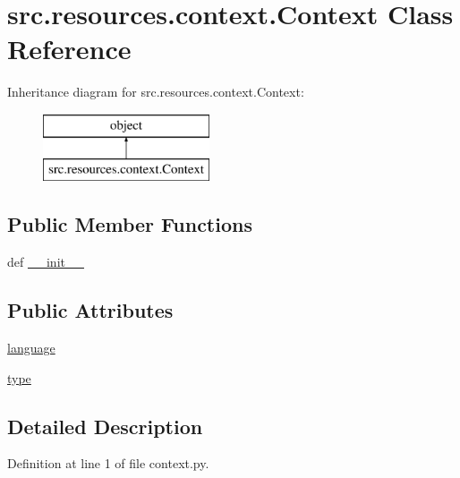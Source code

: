 \hypertarget{classsrc_1_1resources_1_1context_1_1_context}{\section{src.\+resources.\+context.\+Context Class Reference}
\label{classsrc_1_1resources_1_1context_1_1_context}
}
Inheritance diagram for src.\+resources.\+context.\+Context\+:\begin{figure}[H]
\begin{center}
\leavevmode
\includegraphics[height=2.000000cm]{classsrc_1_1resources_1_1context_1_1_context}
\end{center}
\end{figure}
\subsection*{Public Member Functions}
\begin{DoxyCompactItemize}
\item 
def \hyperlink{classsrc_1_1resources_1_1context_1_1_context_a2bd756d083b45ba5d0d542c1e2abe7db}{\+\_\+\+\_\+init\+\_\+\+\_\+}
\end{DoxyCompactItemize}
\subsection*{Public Attributes}
\begin{DoxyCompactItemize}
\item 
\hyperlink{classsrc_1_1resources_1_1context_1_1_context_ab0392a2374b6ffb3139c75e4c47e6719}{language}
\item 
\hyperlink{classsrc_1_1resources_1_1context_1_1_context_a4f11fae3d7a63cbdec6b73c096cee766}{type}
\end{DoxyCompactItemize}


\subsection{Detailed Description}


Definition at line 1 of file context.\+py.




